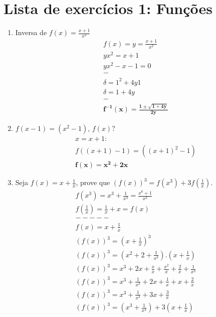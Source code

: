\documentclass{article}
\begin{document}
\section*{Lista de exercícios 1: Funções}
\begin{enumerate}
    \item Inversa de $f(x) = \frac{x+1}{x^{2}}$
        \begin{gather*}
            f(x) = y = \frac{x+1}{x^{2}} \\
            yx^{2} = x+1 \\
            yx^{2}-x-1 = 0 \\
            - \\
            \delta = 1^{2} + 4y1 \\
            \delta = 1 + 4y \\
            - \\
            \mathbf{f^{-1}(x) = \frac{1\pm \sqrt{1+4y}}{2y}}
        \end{gather*}
    \item $f(x-1) = (x^{2}-1)$, $f(x)?$
        \begin{gather*}
            x = x+1: \\
            f((x+1)-1) = ((x+1)^{2}-1) \\
            \mathbf{f(x) = x^{2} + 2x}
        \end{gather*}
    \item Seja $f(x) = x+\frac{1}{x}$, prove que $(f(x))^{3} = f(x^{3})+3f\left(\frac{1}{x}\right).$
        \begin{gather*}
            f(x^{3}) = x^{3}+\frac{1}{x^{3}} = \frac{x^{6}+1}{x^{3}} \\
            f\left(\frac{1}{x}\right) = \frac{1}{x}+x = f(x) \\
            ----- \\
            f(x) = x+\frac{1}{x} \\
            (f(x))^{3} = \left(x+\frac{1}{x}\right)^{3} \\
            (f(x))^{3} = \left(x^{2}+2+\frac{1}{x^{2}}\right).\left(x+\frac{1}{x}\right) \\
            (f(x))^{3} = x^{3}+2x+\frac{x}{x}+\frac{x^{2}}{x}+\frac{2}{x}+\frac{1}{x^{3}} \\
            (f(x))^{3} = x^{3}+\frac{1}{x^{3}}+2x+\frac{1}{x}+x+\frac{2}{x} \\
            (f(x))^{3} = x^{3}+\frac{1}{x^{3}}+3x+\frac{3}{x} \\
            (f(x))^{3} = \left(x^{3}+\frac{1}{x^{3}}\right)+3\left(x+\frac{1}{x}\right) \\

\end{gather*}
\end{enumerate}
\end{document}
